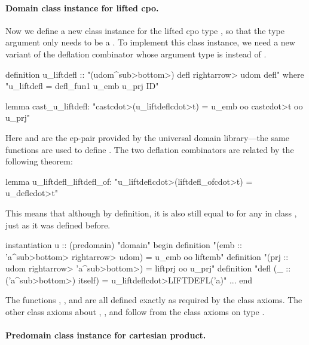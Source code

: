 \paragraph{Domain class instance for lifted cpo.} Now we define a new  class instance for the lifted cpo type , so that the type argument  only needs to be a . To implement this class instance, we need a new variant of the deflation combinator  whose argument type is  instead of .
%
\begin{isacode}
definition u_liftdefl :: "(udom\<^sub>\<bottom>) defl \<rightarrow> udom defl"
  where "u_liftdefl = defl_fun1 u_emb u_prj ID"
\end{isacode}
\unmedskip
{}
\begin{isacode}
lemma cast_u_liftdefl: "cast\<cdot>(u_liftdefl\<cdot>t) = u_emb oo cast\<cdot>t oo u_prj"
\end{isacode}
%
Here  and  are the ep-pair provided by the universal domain library---the same functions are used to define . The two deflation combinators are related by the following theorem:
%
\begin{isacode}
lemma u_liftdefl_liftdefl_of: "u_liftdefl\<cdot>(liftdefl_of\<cdot>t) = u_defl\<cdot>t"
\end{isacode}
%
This means that although  by definition, it is also still equal to  for any  in class , just as it was defined before.
%
\begin{isacode}
instantiation u :: (predomain) "domain"
begin
  definition "(emb :: 'a\<^sub>\<bottom> \<rightarrow> udom) = u_emb oo liftemb"
  definition "(prj :: udom \<rightarrow> 'a\<^sub>\<bottom>) = liftprj oo u_prj"
  definition "defl (_ :: ('a\<^sub>\<bottom>) itself) = u_liftdefl\<cdot>LIFTDEFL('a)"
  ...
end
\end{isacode}
%
The functions , , and  are all defined exactly as required by the  class axioms. The other  class axioms about , , and  follow from the  class axioms on type .

\paragraph{Predomain class instance for cartesian product.}

